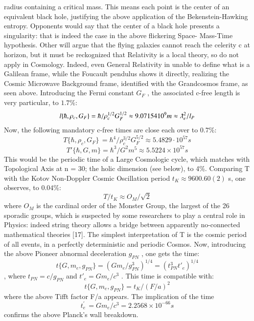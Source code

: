\documentclass[twoside,draft]{article}
\begin{document}
\begin{sloppypar}
{radius containing a critical mass. This means each point is the center of an equivalent black hole,
justifying the above application of the Bekenstein-Hawking entropy. Opponents would say that the
center of a black hole presents a singularity: that is indeed the case in the above flickering Space-
Mass-Time hypothesis. Other will argue that the flying galaxies cannot reach the celerity c at
horizon, but it must be reckognized that Relativity is a local theory, so do not apply in Cosmology.
Indeed, even General Relativity in unable to define what is a Galilean frame, while the Foucault
pendulus shows it directly, realizing the Cosmic Microwave Background frame, identified with the
Grandcosmos frame, as seen above.
Introducing the Fermi constant $G_{F}$ , the associated c-free length is very particular, to $1.7\%$:
$$l\{\hbar,\rho_{c},G_{F}\} = \hbar/\rho_{c}^{1/2} G_{F}^{1/2} \approx 9.07154 10^{9} m \approx \lambdabar_{e}^{2}/l_{P}$$
Now, the following mandatory c-free times are close each over to $0.7\%$:
\begin{equation}
T\{\hbar,\rho_{c} ,G_{F} \}\, = \hbar^{4} /\rho_{c}^{3/2} G_{F}^{5/2} \approx 5.4829 \cdot 10^{57} s
\end{equation}
$$T\prime\{\hbar,G,m\} = \hbar^{3} /G^{2} m^{5} \approx 5.5224 \times 10^{57} s$$
This would be the periodic time of a Large Cosmologic cycle, which matches with Topological Axis at n = 30;
the holic dimension (see below), to 4\%. Comparing T with the Kotov Non-Doppler Cosmic
Oscillation period $t_{K} \approx 9600.60(2)$ s, one observes, to $0.04\%$:
$$T/t_{K} \approx O_{M} /\sqrt{2}$$
where $O_{M}$ is the cardinal order of the Monster Group, the largest of the 26 sporadic groups, which is
suspected by some researchers to play a central role in Physics: indeed string theory allows a bridge
between apparently no-connected mathematical theories \cite{Borcherds}[17]. The simplest interpretation of T is the
cosmic period of all events, in a perfectly deterministic and periodic Cosmos.
Now, introducing the above Pioneer abnormal deceleration $g_{PN}$ , one gets the time: 
\begin{equation}
t\{G, m_{e} , g_{PN} \} = (Gm_{e} /g_{PN}^{3} )^{1/4} = (t_{PN}^{3} t\prime_{e} )^{1/4}
\end{equation}, where $t_{PN} = c/g_{PN}$ and $t\prime_{e} = Gm_{e} /c^{3}$ . This time is compatible with:
\begin{equation}
t\{G, m_{e} , g_{PN} \} = t_{K} /(F/a)^{2}
\end{equation}
where the above Tifft factor F/a appears. The implication of the time 
\begin{equation}
t^{\prime}_{e}\, = Gm_{e} /c^{3} = 2.2568 \times 10^{-66} s
\end{equation}
confirms the above Planck's wall breakdown.

}
\end{sloppypar}
\end{document}
